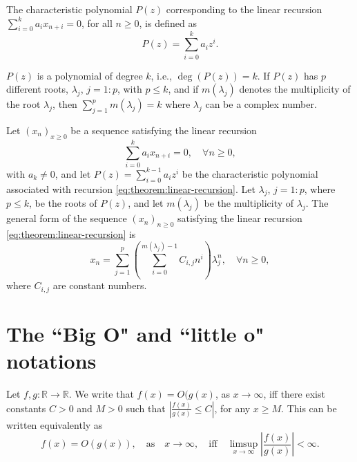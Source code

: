 \begin{definition}
    The characteristic polynomial $ P(z) $ corresponding to the linear recursion $ \sum_{i=0}^{k} a_i x_{n+i} = 0 $, for all $ n \geq 0 $, is defined as
    \begin{equation}
        P(z) = \sum_{i=0}^{k} a_i z^i.
    \end{equation}
\end{definition}

$ P(z) $ is a polynomial of degree $ k $, i.e., $ \deg(P(z)) = k $.
If $ P(z) $ has $ p $ different roots, $ \lambda_j $, $ j = 1 : p $, with $ p \leq k $, and if $ m(\lambda_j) $ denotes the multiplicity of the root $ \lambda_j $, then $ \sum_{j=1}^{p} m(\lambda_j) = k $ where $ \lambda_j $ can be a complex number.

\begin{theorem}
    Let $ (x_n)_{x \geq 0} $ be a sequence satisfying the linear recursion
    \begin{equation}
        \sum_{i=0}^{k} a_i x_{n+i} = 0, \quad \forall n \geq 0,
        \label{eq:theorem:linear-recursion}
    \end{equation}
    with $ a_k \neq 0 $, and let $ P(z) = \sum_{i=0}^{k-1} a_i z^i $ be the characteristic polynomial associated with recursion \eqref{eq:theorem:linear-recursion}.
    Let $ \lambda_j $, $ j = 1 : p $, where $ p \leq k $, be the roots of $ P(z) $, and let $ m(\lambda_j) $ be the multiplicity of $ \lambda_j $.
    The general form of the sequence $ (x_n)_{n \geq 0} $ satisfying the linear
    recursion \eqref{eq:theorem:linear-recursion} is
    \begin{equation}
        x_n = \sum_{j=1}^{p} \left( \sum_{i=0}^{m(\lambda_j)-1} C_{i,j} n^i \right) \lambda_j^n, \quad \forall n \geq 0,
        \label{eq:theorem:linear-recursion-sequence}
    \end{equation}
    where $ C_{i,j} $ are constant numbers.
\end{theorem}

\section{The ``Big O" and ``little o" notations}
\begin{definition}
    Let $ f,g : \mathbb{R} \rightarrow \mathbb{R} $.
    We write that $ f(x) = O(g(x) $, as $ x \rightarrow \infty $, iff there exist constants $ C > 0 $ and $ M > 0 $ such that $ \left| \frac{f(x)}{g(x)} \leq C \right| $, for any $ x \geq M $.
    This can be written equivalently as
    \begin{equation}
        f(x) = O(g(x)), \quad \text{as} \quad x \rightarrow \infty, \quad \text{iff} \quad \limsup_{x \rightarrow \infty} \left| \frac{f(x)}{g(x)} \right| < \infty.
        \label{eq:definition:big-o}
    \end{equation}
\end{definition}


